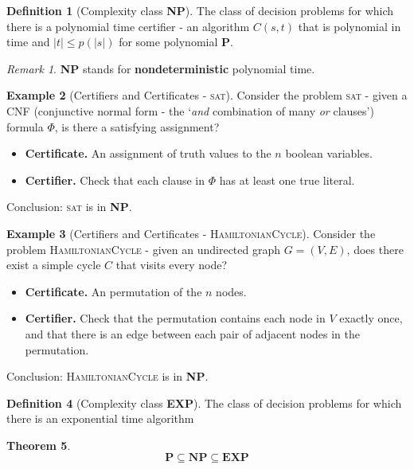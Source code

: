 \documentclass[10pt, oneside, reqno]{amsart}
\theoremstyle{plain}%
\newtheorem{thm}{Theorem}[section]
\theoremstyle{definition}
\newtheorem{defn}[thm]{Definition}
\newtheorem{exmp}[thm]{Example}
\theoremstyle{remark}
\newtheorem*{rem}{Remark}
\begin{document}
\begin{defn}[Complexity class \textbf{NP}]
	The class of decision problems for which there is a polynomial time certifier - an algorithm $C(s,t)$ that is polynomial in time and $|t| \leq p(|s|)$ for some polynomial \textbf{P}.
\end{defn}

\begin{rem}
	\textbf{NP} stands for \textbf{nondeterministic} polynomial time.
\end{rem}

\begin{exmp}[Certifiers and Certificates - \textsc{sat}]
	Consider the problem \textsc{sat} - given a CNF (conjunctive normal form - the `\emph{and} combination of many \emph{or} clauses') formula $\Phi$, is there a satisfying assignment?
	\begin{itemize}
		\item \textbf{Certificate.} An assignment of truth values to the $n$ boolean variables.
		\item \textbf{Certifier.} Check that each clause in $\Phi$ has at least one true literal.
	\end{itemize}
	
	Conclusion: \textsc{sat} is in \textbf{NP}.
\end{exmp}

\begin{exmp}[Certifiers and Certificates - \textsc{HamiltonianCycle}]
	Consider the problem \textsc{HamiltonianCycle} - given an undirected graph $G = (V,E)$, does there exist a simple cycle $C$ that visits every node?
	\begin{itemize}
		\item \textbf{Certificate.} An permutation of the $n$ nodes.
		\item \textbf{Certifier.} Check that the permutation contains each node in $V$ exactly once, and that there is an edge between each pair of adjacent nodes in the permutation.
	\end{itemize}
	
	
	Conclusion: \textsc{HamiltonianCycle} is in \textbf{NP}.
\end{exmp}


\begin{defn}[Complexity class \textbf{EXP}]
	The class of decision problems for which there is an exponential time algorithm
\end{defn}

\begin{thm}
\[
	\mathbf{P} \subseteq \mathbf{NP} \subseteq \mathbf{EXP}
\]\end{thm}
\end{document}
